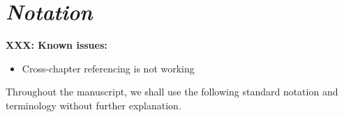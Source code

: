 \documentclass[nobib, a4paper, notoc, twoside, justified, openany]{tufte-book}
\begin{document}







\begin{fullwidth}
  \setcounter{tocdepth}{3}

\tableofcontents
\end{fullwidth}

\clearpage
{\section*{\Huge \it Notation}}
\label{sec:notations}

\textbf{XXX: Known issues:}
\begin{itemize}
\item  Cross-chapter referencing is not working
\end{itemize}


Throughout the manuscript, we shall use the following standard notation
and terminology without further explanation.
\end{document}
